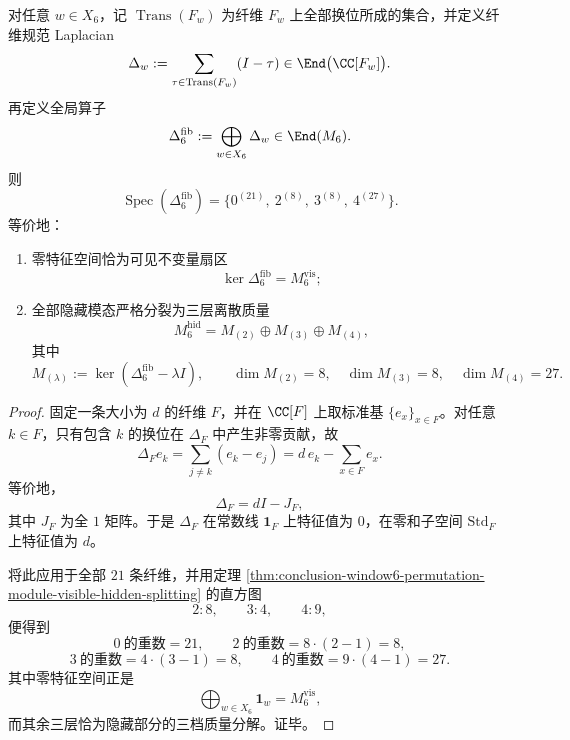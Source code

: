 \begin{theorem}\label{thm:conclusion-window6-fiber-gauge-laplacian-spectrum}
对任意 \(w\in X_6\)，记 \(\operatorname{Trans}(F_w)\) 为纤维 \(F_w\) 上全部换位所成的集合，并定义纤维规范 Laplacian
\[
\Delta_w:=\sum_{\tau\in\operatorname{Trans}(F_w)}(I-\tau)
\in \End\bigl(\CC[F_w]\bigr).
\]
再定义全局算子
\[
\Delta_6^{\mathrm{fib}}
:=
\bigoplus_{w\in X_6}\Delta_w
\in \End(M_6).
\]
则
\[
\operatorname{Spec}(\Delta_6^{\mathrm{fib}})
=
\{0^{(21)},\ 2^{(8)},\ 3^{(8)},\ 4^{(27)}\}.
\]
等价地：
\begin{enumerate}
  \item 零特征空间恰为可见不变量扇区
  \[
  \ker \Delta_6^{\mathrm{fib}}=M_6^{\mathrm{vis}};
  \]
  \item 全部隐藏模态严格分裂为三层离散质量
  \[
  M_6^{\mathrm{hid}}=M_{(2)}\oplus M_{(3)}\oplus M_{(4)},
  \]
  其中
  \[
  M_{(\lambda)}:=\ker(\Delta_6^{\mathrm{fib}}-\lambda I),
  \qquad
  \dim M_{(2)}=8,\quad \dim M_{(3)}=8,\quad \dim M_{(4)}=27.
  \]
\end{enumerate}
\end{theorem}
\begin{proof}
固定一条大小为 \(d\) 的纤维 \(F\)，并在 \(\CC[F]\) 上取标准基 \(\{e_x\}_{x\in F}\)。对任意 \(k\in F\)，只有包含 \(k\) 的换位在 \(\Delta_F\) 中产生非零贡献，故
\[
\Delta_F e_k
=
\sum_{j\neq k}(e_k-e_j)
=
d\,e_k-\sum_{x\in F}e_x.
\]
等价地，
\[
\Delta_F=dI-J_F,
\]
其中 \(J_F\) 为全 \(1\) 矩阵。于是 \(\Delta_F\) 在常数线 \(\mathbf 1_F\) 上特征值为 \(0\)，在零和子空间 \(\mathrm{Std}_F\) 上特征值为 \(d\)。

将此应用于全部 \(21\) 条纤维，并用定理 \ref{thm:conclusion-window6-permutation-module-visible-hidden-splitting} 的直方图
\[
2:8,\qquad 3:4,\qquad 4:9,
\]
便得到
\[
0\ \text{的重数}=21,
\qquad
2\ \text{的重数}=8\cdot(2-1)=8,
\]
\[
3\ \text{的重数}=4\cdot(3-1)=8,
\qquad
4\ \text{的重数}=9\cdot(4-1)=27.
\]
其中零特征空间正是
\[
\bigoplus_{w\in X_6}\mathbf 1_w=M_6^{\mathrm{vis}},
\]
而其余三层恰为隐藏部分的三档质量分解。证毕。
\end{proof}

